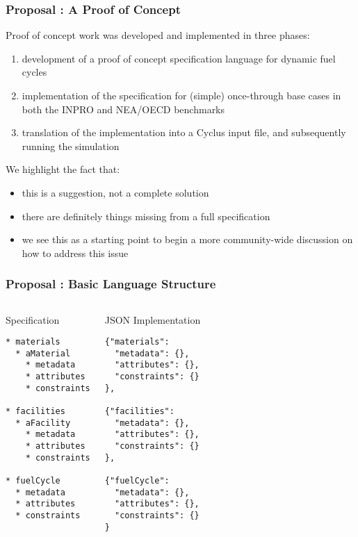 
\begin{frame}[ctb!]
  \frametitle{Proposal : A Proof of Concept} 

  Proof of concept work was developed and implemented in three phases:

  \begin{enumerate}
    \item development of a proof of concept specification language for dynamic
      fuel cycles
    \item implementation of the specification for (simple) once-through base
      cases in both the INPRO and NEA/OECD benchmarks
    \item translation of the implementation into a Cyclus input file, and
      subsequently running the simulation
  \end{enumerate}

  \pause
  
  We highlight the fact that:

  \begin{itemize}
    \item this is a suggestion, not a complete solution
    \item there are definitely things missing from a full specification
    \item we see this as a starting point to begin a more community-wide
      discussion on how to address this issue
  \end{itemize}
\end{frame}

\begin{frame}[fragile]
  \frametitle{Proposal : Basic Language Structure}
  \begin{columns}[t]
    \begin{block}{Specification}\begin{small}\begin{verbatim}
* materials
  * aMaterial
    * metadata
    * attributes
    * constraints
      
* facilities
  * aFacility
    * metadata
    * attributes
    * constraints
      
* fuelCycle
  * metadata
  * attributes
  * constraints
    \end{verbatim}\end{small}\end{block}
    \begin{block}{JSON Implementation}\begin{small}\begin{verbatim}
{"materials":     
  "metadata": {},
  "attributes": {},
  "constraints": {}
},
      
{"facilities":     
  "metadata": {},
  "attributes": {},
  "constraints": {}
},

{"fuelCycle":     
  "metadata": {},
  "attributes": {},
  "constraints": {}
}
      \end{verbatim}\end{small}\end{block}
  \end{columns}
\end{frame}

